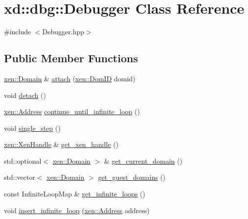 \hypertarget{classxd_1_1dbg_1_1_debugger}{}\section{xd\+:\+:dbg\+:\+:Debugger Class Reference}
\label{classxd_1_1dbg_1_1_debugger}


{\ttfamily \#include $<$Debugger.\+hpp$>$}

\subsection*{Public Member Functions}
\begin{DoxyCompactItemize}
\item 
\mbox{\hyperlink{classxd_1_1xen_1_1_domain}{xen\+::\+Domain}} \& \mbox{\hyperlink{classxd_1_1dbg_1_1_debugger_ae398868e872eca4e9b920872c28ded64}{attach}} (\mbox{\hyperlink{namespacexd_1_1xen_aaad6b5eb6f7e5ba76a4e4ca166ac8a08}{xen\+::\+Dom\+ID}} domid)
\item 
void \mbox{\hyperlink{classxd_1_1dbg_1_1_debugger_a5e104b83ee08778977da0bd3277795db}{detach}} ()
\item 
\mbox{\hyperlink{namespacexd_1_1xen_a94a8d6c9448e8330c771c100dba152c3}{xen\+::\+Address}} \mbox{\hyperlink{classxd_1_1dbg_1_1_debugger_af75fdf2c87819aa19e89c134de6d67ca}{continue\+\_\+until\+\_\+infinite\+\_\+loop}} ()
\item 
void \mbox{\hyperlink{classxd_1_1dbg_1_1_debugger_ae22024cb4bd5d00f61a46d166356990f}{single\+\_\+step}} ()
\item 
\mbox{\hyperlink{classxd_1_1xen_1_1_xen_handle}{xen\+::\+Xen\+Handle}} \& \mbox{\hyperlink{classxd_1_1dbg_1_1_debugger_aabee0b1f45a9c3468fe70358dbd6ca61}{get\+\_\+xen\+\_\+handle}} ()
\item 
std\+::optional$<$ \mbox{\hyperlink{classxd_1_1xen_1_1_domain}{xen\+::\+Domain}} $>$ \& \mbox{\hyperlink{classxd_1_1dbg_1_1_debugger_ab0321f2241f8bfb7e74fc5f04e86c1cb}{get\+\_\+current\+\_\+domain}} ()
\item 
std\+::vector$<$ \mbox{\hyperlink{classxd_1_1xen_1_1_domain}{xen\+::\+Domain}} $>$ \mbox{\hyperlink{classxd_1_1dbg_1_1_debugger_a733f91d159e4ba35e0f43ae52edcf7af}{get\+\_\+guest\+\_\+domains}} ()
\item 
const Infinite\+Loop\+Map \& \mbox{\hyperlink{classxd_1_1dbg_1_1_debugger_a91d2c466c13db9598524d46257e94745}{get\+\_\+infinite\+\_\+loops}} ()
\item 
void \mbox{\hyperlink{classxd_1_1dbg_1_1_debugger_a596d71af13ccae02c723351c016e6096}{insert\+\_\+infinite\+\_\+loop}} (\mbox{\hyperlink{namespacexd_1_1xen_a94a8d6c9448e8330c771c100dba152c3}{xen\+::\+Address}} address)

\end{DoxyCompactItemize}
